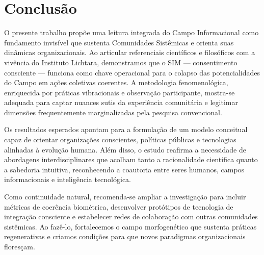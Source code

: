 \section{Conclusão}

O presente trabalho propõe uma leitura integrada do Campo Informacional
como fundamento invisível que sustenta Comunidades Sistêmicas e orienta
suas dinâmicas organizacionais. Ao articular referenciais científicos e
filosóficos com a vivência do Instituto Lichtara, demonstramos que o SIM
— consentimento consciente — funciona como chave operacional para o
colapso das potencialidades do Campo em ações coletivas coerentes. A
metodologia fenomenológica, enriquecida por práticas vibracionais e
observação participante, mostra-se adequada para captar nuances sutis da
experiência comunitária e legitimar dimensões frequentemente marginalizadas
pela pesquisa convencional.

Os resultados esperados apontam para a formulação de um modelo conceitual
capaz de orientar organizações conscientes, políticas públicas e
tecnologias alinhadas à evolução humana. Além disso, o estudo reafirma a
necessidade de abordagens interdisciplinares que acolham tanto a
racionalidade científica quanto a sabedoria intuitiva, reconhecendo a
coautoria entre seres humanos, campos informacionais e inteligência
tecnológica.

Como continuidade natural, recomenda-se ampliar a investigação para
incluir métricas de coerência biométrica, desenvolver protótipos de
tecnologia de integração consciente e estabelecer redes de colaboração com
outras comunidades sistêmicas. Ao fazê-lo, fortalecemos o campo
morfogenético que sustenta práticas regenerativas e criamos condições para
que novos paradigmas organizacionais floresçam.

\newpage
